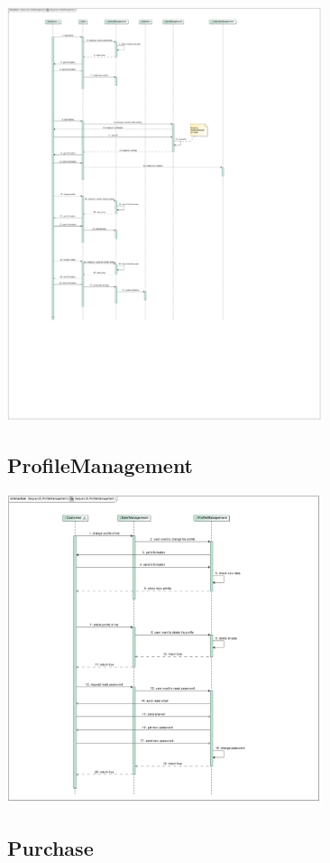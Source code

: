 \documentclass[a4paper]{article}
\begin{document}
\includegraphics[width=350px]{sd-articlemanagement.jpg}

\subsection{ProfileManagement}

\includegraphics[width=350px]{sd-profilemanagement.jpg}

\subsection{Purchase}
\end{document}

